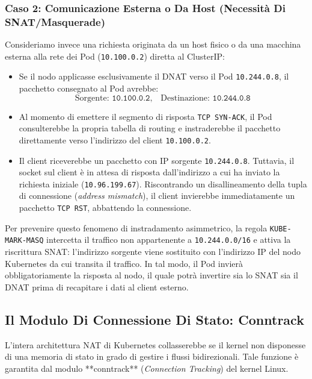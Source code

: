 \documentclass[11pt, a4paper]{article}
\begin{document}
\subsubsection{Caso 2: Comunicazione Esterna o Da Host (Necessità Di SNAT/Masquerade)}
Consideriamo invece una richiesta originata da un host fisico o da una macchina esterna alla rete dei Pod (\texttt{10.100.0.2}) diretta al ClusterIP:
\begin{itemize}[noitemsep]
    \item Se il nodo applicasse esclusivamente il DNAT verso il Pod \texttt{10.244.0.8}, il pacchetto consegnato al Pod avrebbe:
    \[
        \text{Sorgente: } \texttt{10.100.0.2}, \quad \text{Destinazione: } \texttt{10.244.0.8}
    \]
    \item Al momento di emettere il segmento di risposta \texttt{TCP SYN-ACK}, il Pod consulterebbe la propria tabella di routing e instraderebbe il pacchetto direttamente verso l'indirizzo del client \texttt{10.100.0.2}.
    \item Il client riceverebbe un pacchetto con IP sorgente \texttt{10.244.0.8}. Tuttavia, il socket sul client è in attesa di risposta dall'indirizzo a cui ha inviato la richiesta iniziale (\texttt{10.96.199.67}). Riscontrando un disallineamento della tupla di connessione (\emph{address mismatch}), il client invierebbe immediatamente un pacchetto \texttt{TCP RST}, abbattendo la connessione.
\end{itemize}

Per prevenire questo fenomeno di instradamento asimmetrico, la regola \texttt{KUBE-MARK-MASQ} intercetta il traffico non appartenente a \texttt{10.244.0.0/16} e attiva la riscrittura SNAT: l'indirizzo sorgente viene sostituito con l'indirizzo IP del nodo Kubernetes da cui transita il traffico. In tal modo, il Pod invierà obbligatoriamente la risposta al nodo, il quale potrà invertire sia lo SNAT sia il DNAT prima di recapitare i dati al client esterno.

\subsection{Il Modulo Di Connessione Di Stato: Conntrack}
L'intera architettura NAT di Kubernetes collasserebbe se il kernel non disponesse di una memoria di stato in grado di gestire i flussi bidirezionali. Tale funzione è garantita dal modulo **conntrack** (\emph{Connection Tracking}) del kernel Linux.
\end{document}
